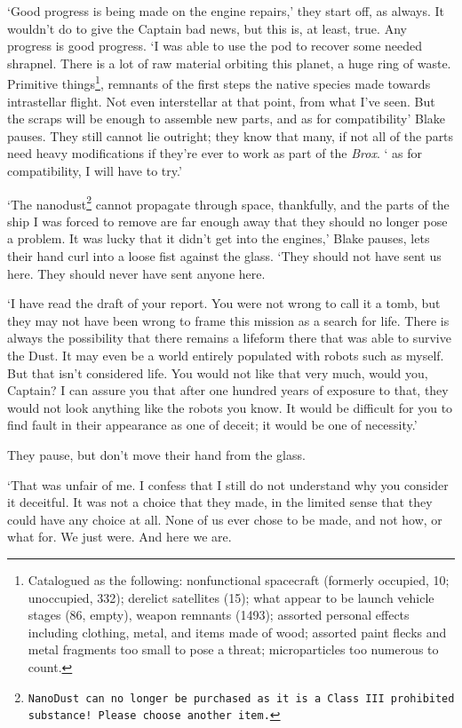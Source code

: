 `Good progress is being made on the engine repairs,' they start off,
as always. It wouldn't do to give the Captain bad news, but this is,
at least, true. Any progress is good progress. `I was able to use the
pod to recover some needed shrapnel. There is a lot of raw material
orbiting this planet, a huge ring of waste. Primitive
things\footnote{Catalogued as the following: nonfunctional spacecraft
(formerly occupied, 10; unoccupied, 332); derelict satellites (15);
what appear to be launch vehicle stages (86, empty), weapon remnants
(1493); assorted personal effects including clothing, metal, and items
made of wood; assorted paint flecks and metal fragments too small to
pose a threat; microparticles too numerous to count.}, remnants of
the first steps the native species made towards intrastellar
flight. Not even interstellar at that point, from what I've seen. But
the scraps will be enough to assemble new parts, and as for
compatibility\textemdash' Blake pauses. They still cannot lie
outright; they know that many, if not all of the parts need heavy
modifications if they're ever to work as part of the \textit{Brox}.
`\textemdash{} as for compatibility, I will have to try.'

`The nanodust\footnote{\texttt{NanoDust\texttrademark{} can no longer be
purchased as it is a Class III prohibited substance! Please choose
another item.}} cannot propagate through space, thankfully, and the
parts of the ship I was forced to remove are far enough away that they
should no longer pose a problem. It was lucky that it didn't get into
the engines,' Blake pauses, lets their hand curl into a loose fist
against the glass. `They should not have sent us here. They should
never have sent anyone here.

`I have read the draft of your report. You were not wrong to call it a
tomb, but they may not have been wrong to frame this mission as a
search for life. There is always the possibility that there remains a
lifeform there that was able to survive the Dust. It may even be a
world entirely populated with robots such as myself. But that isn't
considered life. You would not like that very much, would you,
Captain? I can assure you that after one hundred years of exposure to
that, they would not look anything like the robots you know. It would
be difficult for you to find fault in their appearance as one of
deceit; it would be one of necessity.'

They pause, but don't move their hand from the glass.

`That was unfair of me. I confess that I still do not understand why
you consider it deceitful. It was not a choice that they made, in the
limited sense that they could have any choice at all. None of us ever
chose to be made, and not how, or what for. We just\textemdash
were. And here we are.

